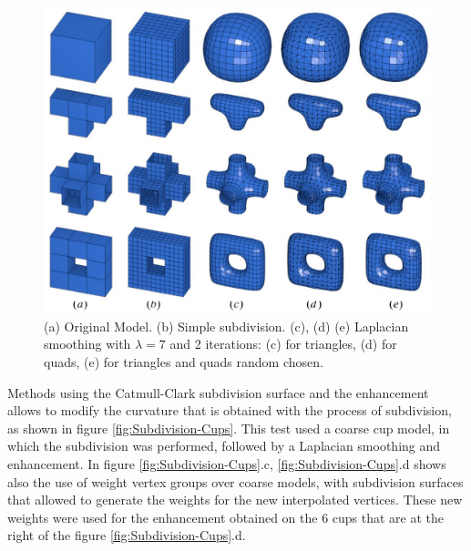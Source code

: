 \documentclass[10pt, conference]{IEEEtran}
\begin{document}
\begin{figure}
\includegraphics[width=1\columnwidth]{figs/test_triangles_quads}

\caption{\label{fig:TQLBO_test}(a) Original Model. (b) Simple subdivision.
(c), (d) (e) Laplacian smoothing with $\lambda=7$ and 2 iterations:
(c) for triangles, (d) for quads, (e) for triangles and quads random
chosen.}
\end{figure}


Methods using the Catmull-Clark subdivision surface and the enhancement
allows to modify the curvature that is obtained with the process of
subdivision, as shown in figure \eqref{fig:Subdivision-Cups}. This
test used a coarse cup model, in which the subdivision was performed,
followed by a Laplacian smoothing and enhancement. In figure \eqref{fig:Subdivision-Cups}.c,
\eqref{fig:Subdivision-Cups}.d shows also the use of weight vertex
groups over coarse models, with subdivision surfaces that allowed
to generate the weights for the new interpolated vertices. These new
weights were used for the enhancement obtained on the 6 cups that
are at the right of the figure \eqref{fig:Subdivision-Cups}.d.
\end{document}

